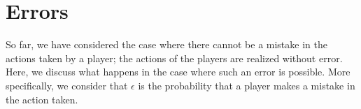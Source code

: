 \documentclass[11pt]{article}
\theoremstyle{plainCl1}
\theoremstyle{plainCl2}
\begin{document}




\newpage

\section{Errors}

So far, we have considered the case where there cannot be a mistake in the
actions taken by a player; the actions of the players are realized without
error. Here, we discuss what happens in the case where such an error is
possible. More specifically, we consider that \(\epsilon\) is the probability
that a player makes a mistake in the action taken.
\end{document}
